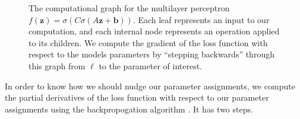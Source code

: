 \begin{figure}
	\centering

	\caption{The computational graph for the multilayer perceptron $f(\mathbf z) = \sigma(C \sigma(A\mathbf z +\mathbf b))$. Each leaf represents an input to our computation, and each internal node represents an operation applied to its children. We compute the gradient of the loss function with respect to the models parameters by ``stepping backwards'' through this graph from $\ell$ to the parameter of interest.}
	\label{fig:mlp-computational-graph}
\end{figure}

In order to know how we should nudge our parameter assignments, we compute the partial derivatives of the loss function with respect to our parameter assignments using the backpropogation algorithm \cite[\S 13.3]{PML}. It has two steps.

